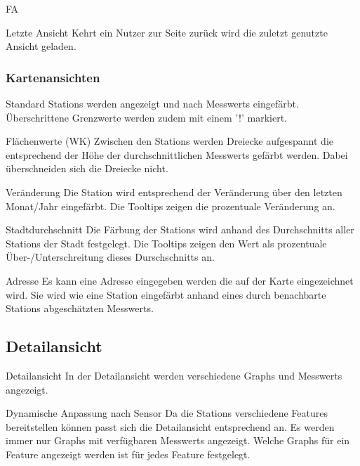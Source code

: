 \begin{Kriterien}{FA}
 \item[Letzte Ansicht]
  Kehrt ein Nutzer zur Seite zurück wird die zuletzt genutzte Ansicht geladen.

 \subsubsection{Kartenansichten}

 \item[Standard]
  \glspl{Station} werden angezeigt und nach \glspl{Messwert} eingefärbt. 
  Überschrittene Grenzwerte werden zudem mit einem '!' markiert.

 \item[Flächenwerte (WK)]
   Zwischen den \glspl{Station} werden Dreiecke aufgespannt die entsprechend der Höhe der durchschnittlichen \glspl{Messwert} gefärbt werden.
   Dabei überschneiden sich die Dreiecke nicht.

 \item[Veränderung]
   Die \gls{Station} wird entsprechend der Veränderung über den letzten Monat/Jahr eingefärbt.
   Die \glspl{Tooltip} zeigen die prozentuale Veränderung an.

 \item[Stadtdurchschnitt]
  Die Färbung der \glspl{Station} wird anhand des Durchschnitts aller \glspl{Station} der Stadt festgelegt.
  Die \glspl{Tooltip} zeigen den Wert als prozentuale Über-/Unterschreitung dieses Durschschnitts an. 

 \item[Adresse]
   Es kann eine Adresse eingegeben werden die auf der Karte eingezeichnet wird.
   Sie wird wie eine \gls{Station} eingefärbt anhand eines durch benachbarte \glspl{Station} abgeschätzten \glspl{Messwert}.

\subsection{Detailansicht}

 \item[Detailansicht]
   In der Detailansicht werden verschiedene \glspl{Graph} und \glspl{Messwert} angezeigt. 

 \item[Dynamische Anpassung nach Sensor]
   Da die \glspl{Station} verschiedene \glspl{Feature} bereitstellen können passt sich die Detailansicht entsprechend an.
   Es werden immer nur \glspl{Graph} mit verfügbaren \glspl{Messwert} angezeigt.
   Welche \glspl{Graph} für ein \gls{Feature} angezeigt werden ist für jedes \gls{Feature} festgelegt.


\end{Kriterien}
